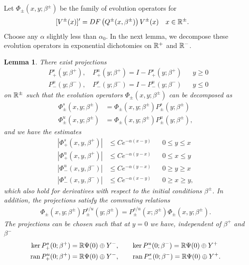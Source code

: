 \documentclass[10pt,reqno]{amsart}
\theoremstyle{plain}
\newtheorem{lemma}[theorem]{Lemma}
\theoremstyle{definition}
\theoremstyle{remark}
\numberwithin{theorem}{section}
\numberwithin{equation}{section}
\begin{document}
Let $\Phi_\pm(x, y; \beta^\pm)$ be the family of evolution operators for
\begin{align}\label{qpmODEs}
[V^\pm(x)]' &= D F\left(Q^\pm(x, \beta^\pm)\right) V^\pm(x) && x \in \mathbb{R}^\pm.
\end{align}
Choose any $\alpha$ slightly less than $\alpha_0$. In the next lemma, we decompose these evolution operators in exponential dichotomies on $\mathbb{R}^+$ and $\mathbb{R}^-$. 

\begin{lemma}\label{dichotomy1}
There exist projections
\begin{align*}
&P_+^s(y; \beta^+), \quad P_+^u(y; \beta^+) = I - P_+^s(y; \beta^+) && y \geq 0 \\
&P_-^u(y; \beta^-), \quad P_-^s(y; \beta^-) = I - P_-^u(y; \beta^-) && y \leq 0 
\end{align*}
on $\mathbb{R}^\pm$ such that the evolution operators $\Phi_\pm(x, y; \beta^\pm)$ can be decomposed as
\begin{align*}
\Phi^s_\pm(x, y; \beta^\pm) &= \Phi_\pm(x, y; \beta^\pm) P^s_\pm(y; \beta^\pm) \\
\Phi^u_\pm(x, y; \beta^\pm) &= \Phi_\pm(x, y; \beta^\pm) P^u_\pm(y; \beta^\pm),
\end{align*}
and we have the estimates
\begin{align*}
|\Phi^s_+(x, y, \beta^+)| &\leq C e^{-\alpha(x - y)} && 0 \leq y \leq x \\
|\Phi^u_+(x, y, \beta^+)| &\leq C e^{-\alpha(y - x)} && 0 \leq x \leq y \\
|\Phi^u_-(x, y, \beta^-)| &\leq C e^{-\alpha(y - x)} && 0 \geq y \geq x \\
|\Phi^s_-(x, y, \beta^-)| &\leq C e^{-\alpha(x - y)} && 0 \geq x \geq y,
\end{align*}
which also hold for derivatives with respect to the initial conditions $\beta^\pm$. In addition, the projections satisfy the commuting relations
\begin{align*}
\Phi_\pm(x, y; \beta^\pm) P^{s/u}_\pm(y; \beta^\pm) 
= P^{s/u}_\pm(x; \beta^\pm) \Phi_\pm(x, y; \beta^\pm).
\end{align*}
The projections can be chosen such that at $y = 0$ we have, independent of $\beta^+$ and $\beta^-$
\begin{align*}
\ker P^s_+(0; \beta^+) &= \R \Psi(0) \oplus Y^-, \qquad
\ker P^u_-(0; \beta^-) = \R \Psi(0) \oplus Y^+ \\
\ran P^u_+(0; \beta^+) &= \R \Psi(0) \oplus Y^-, \qquad
\ran P^s_-(0; \beta^-) = \R \Psi(0) \oplus Y^+.

\end{align*}
\end{lemma}
\end{document}
